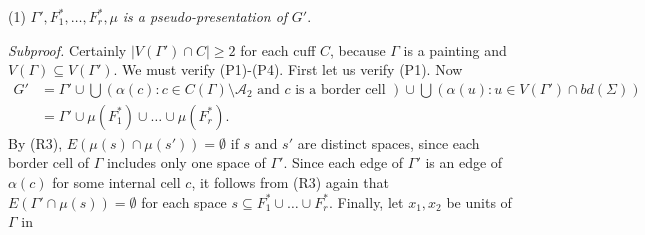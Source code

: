 \hspace*{12pt}(1) $\Gamma', F_1^*, \dots, F_r^*, \mu$ \textit{is a pseudo-presentation of} $G'$.

\textit{Subproof.} Certainly $|V(\Gamma') \cap C| \ge 2$ for each cuff $C$, because $\Gamma$ is a painting and $V(\Gamma) \subseteq V(\Gamma')$. We must verify (P1)-(P4). First let us verify (P1). Now
\begin{align*}
G' &= \Gamma' \cup \bigcup(\alpha(c) : c \in C(\Gamma) \setminus \mathcal{A}_2 \text{ and } c \text{ is a border cell } ) \cup \bigcup(\alpha(u) : u \in V(\Gamma') \cap bd(\Sigma)) \\
&= \Gamma' \cup \mu(F_1^*) \cup \dots \cup \mu(F_r^*).
\end{align*}
By (R3), $E(\mu(s) \cap \mu(s')) = \emptyset$ if $s$ and $s'$ are distinct spaces, since each border cell of $\Gamma$ includes only one space of $\Gamma'$. Since each edge of $\Gamma'$ is an edge of $\alpha(c)$ for some internal cell $c$, it follows from (R3) again that $E(\Gamma' \cap \mu(s)) = \emptyset$ for each space $s \subseteq F_1^* \cup \dots \cup F_r^*$. Finally, let $x_1, x_2$ be units of $\Gamma$ in
